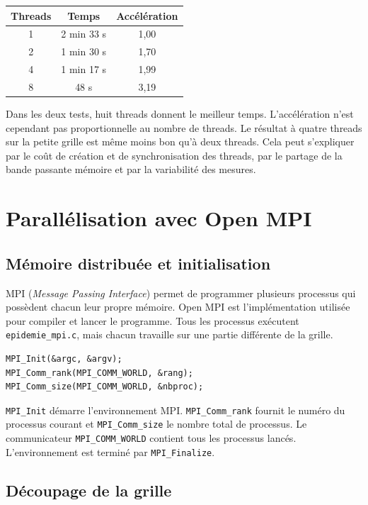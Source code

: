 \documentclass[a4paper,12pt]{article}
\begin{document}
\begin{center}
\begin{tabular}{|c|c|c|}
	\hline
	\textbf{Threads} & \textbf{Temps} & \textbf{Accélération} \\ \hline
	1 & 2 min 33 s & 1,00 \\ \hline
	2 & 1 min 30 s & 1,70 \\ \hline
	4 & 1 min 17 s & 1,99 \\ \hline
	8 & 48 s & 3,19 \\ \hline
\end{tabular}
\end{center}

Dans les deux tests, huit threads donnent le meilleur temps. L'accélération
n'est cependant pas proportionnelle au nombre de threads. Le résultat à quatre
threads sur la petite grille est même moins bon qu'à deux threads. Cela peut
s'expliquer par le coût de création et de synchronisation des threads, par le
partage de la bande passante mémoire et par la variabilité des mesures.

\section{Parallélisation avec Open MPI}

\subsection{Mémoire distribuée et initialisation}

MPI (\textit{Message Passing Interface}) permet de programmer plusieurs
processus qui possèdent chacun leur propre mémoire. Open MPI est
l'implémentation utilisée pour compiler et lancer le programme. Tous les
processus exécutent \texttt{epidemie\_mpi.c}, mais chacun travaille sur une
partie différente de la grille.

\begin{lstlisting}
MPI_Init(&argc, &argv);
MPI_Comm_rank(MPI_COMM_WORLD, &rang);
MPI_Comm_size(MPI_COMM_WORLD, &nbproc);
\end{lstlisting}

\texttt{MPI\_Init} démarre l'environnement MPI.
\texttt{MPI\_Comm\_rank} fournit le numéro du processus courant et
\texttt{MPI\_Comm\_size} le nombre total de processus. Le communicateur
\texttt{MPI\_COMM\_WORLD} contient tous les processus lancés. L'environnement
est terminé par \texttt{MPI\_Finalize}.

\subsection{Découpage de la grille}
\end{document}
